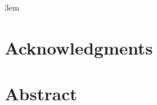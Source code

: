 \documentclass[10pt,twoside]{book}
\begin{document}
\emergencystretch 3em

\frontmatter



\chapter{Acknowledgments}

\clearpage

\chapter{Abstract}

\clearpage




% 



% 


% 

\end{document}
